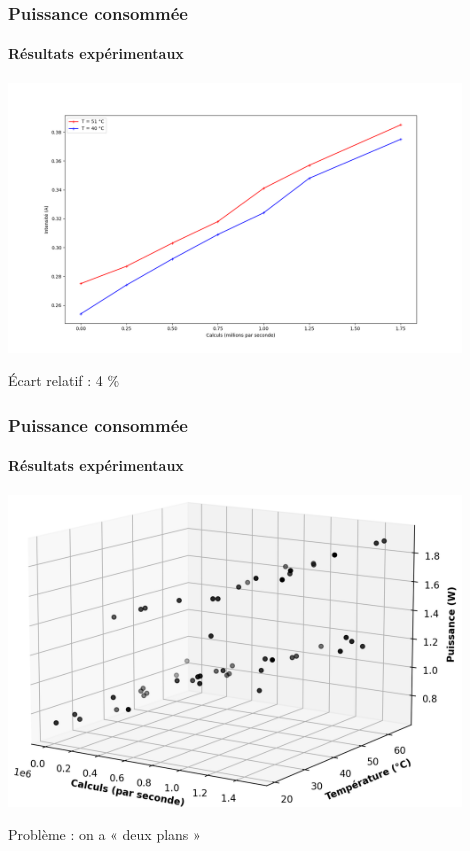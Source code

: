 \documentclass[a4paper,11pt]{beamer}
\begin{document}
\begin{frame}
    \frametitle{Puissance consommée}
    \framesubtitle{Résultats expérimentaux}

    \includegraphics[width=0.9\textwidth]{difference_en_temperature.png}

    \begin{center}
        Écart relatif : 4 \%
    \end{center}
\end{frame}

\begin{frame}
    \frametitle{Puissance consommée}
    \framesubtitle{Résultats expérimentaux}

    \includegraphics[width=0.9\textwidth]{tous_les_points.png}

    Problème : on a « deux plans »
\end{frame}
\end{document}
